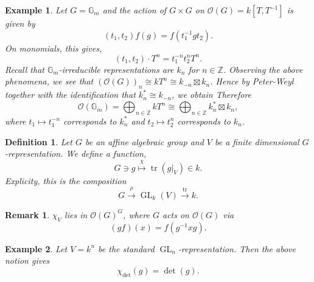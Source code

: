 \documentclass[10pt]{article}
\newtheorem{definition}{Definition}[section]
\newtheorem{remark}{Remark}[section]
\newtheorem{example}{Example}[section]
\numberwithin{equation}{theorem}
\DeclareMathOperator{\tr}{tr}
\DeclareMathOperator{\GL}{GL}
\newcommand{\Ouv}[0]{\mathcal{O}}
\newcommand{\Z}[0]{\mathbb{Z}}
\newcommand{\G}[0]{\mathbb{G}}
\begin{document}
\begin{example}
Let $G= \G_m$ and the action of $G\times G$ on $\Ouv(G)=k[T,T^{-1}]$ is given by 
\begin{equation*}
  (t_1,t_2)f(g) = f(t_1^{-1}gt_2).
\end{equation*}
On monomials, this gives,
\begin{equation*}
  (t_1,t_2)\cdot T^n = t_1^{-n}t_2^nT^n.
\end{equation*}
Recall that $\G_m$-irreducible representations are $k_n$ for $n\in\Z$. Observing the above phenomena, we see that $(\Ouv(G))_n\cong kT^n\cong k_{-n}\boxtimes k_n$. Hence by Peter-Weyl together with the identification that $k_n^*\cong k_{-n}$, we obtain %
Therefore 
\begin{equation*}
  \Ouv(\G_m) = \bigoplus_{n\in\Z}kT^n \cong \bigoplus_{n\in\Z}k_n^*\boxtimes k_n,
\end{equation*}
where $t_1\mapsto t_1^{-n}$ corresponds to $k_n^*$ and $t_2\mapsto t_2^n$ corresponds to $k_n$.
\end{example}
\begin{definition}
  Let $G$ be an affine algebraic group and $V$ be a finite dimensional $G$-representation. We define a function,
  \begin{equation*}
    G\ni g\stackrel{\chi}{\mapsto}\tr(g|_V)\in k.
  \end{equation*}
  Explicity, this is the composition 
    \begin{equation*}
      G\stackrel{\rho}{\to}\GL_k(V)\stackrel{\tr}{\to}k.
    \end{equation*}
\end{definition}
\begin{remark}
    $\chi_V$ lies in $\mathcal{O}(G)^G$, where $G$ acts on $\Ouv(G)$ via 
  \begin{equation*}
    (gf)(x) = f(g^{-1}xg).
  \end{equation*}
\end{remark}
\begin{example}
  Let $V=k^n$ be the standard $\GL_n$-representation. Then the above notion gives
  \begin{equation*}
    \chi_{\det}(g) = \det(g).
  \end{equation*}
\end{example}
\end{document}
